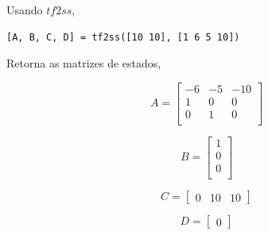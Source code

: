 \documentclass[a4paper, 10pt]{article}
\begin{document}
\begin{list}{\textbf{Questão .}}{
\setlength{\labelwidth}{-2mm} \setlength{\parsep}{0mm}
\setlength{\topsep}{0mm} \setlength{\leftmargin}{0mm}}
            Usando $tf2ss$, 

            \begin{lstlisting}
[A, B, C, D] = tf2ss([10 10], [1 6 5 10])
            \end{lstlisting}

            Retorna as matrizes de estados,

            $$
            A = \left[\begin{array}{rrr}
                    -6 & -5 & -10 \\
                    1 & 0 & 0 \\
                    0 & 1 & 0 \\
            \end{array}\right]
            $$

            $$
            B = \left[\begin{array}{r}
                1 \\
                0 \\
                0 \\
            \end{array}\right]
            $$

            $$
            C = \left[\begin{array}{rrr}
                0 & 10 & 10
               \end{array}\right]
            $$

            $$
            D = \left[\begin{array}{r}
                0 
               \end{array}\right]
            $$



\end{list}
\end{document}
